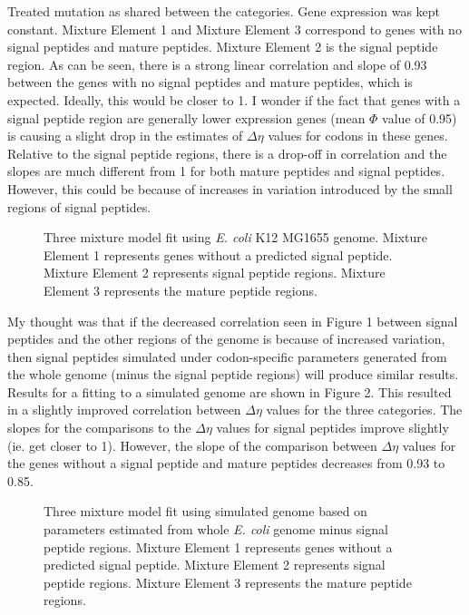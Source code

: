 \documentclass[11pt]{labbook}
\begin{document}
Treated mutation as shared between the categories. Gene expression was kept constant. Mixture Element 1 and Mixture Element 3 correspond to genes with no signal peptides and mature peptides. Mixture Element 2 is the signal peptide region. As can be seen, there is a strong linear correlation and slope of 0.93 between the genes with no signal peptides and mature peptides, which is expected. Ideally, this would be closer to 1. I wonder if the fact that genes with a signal peptide region are generally lower expression genes (mean $\Phi$ value of 0.95) is causing a slight drop in the estimates of $\Delta\eta$ values for codons in these genes. Relative to the signal peptide regions, there is a drop-off in correlation and the slopes are much different from 1 for both mature peptides and signal peptides. However, this could be because of increases in variation introduced by the small regions of signal peptides.
\begin{figure}
\caption{Three mixture model fit using \textit{E. coli} K12 MG1655 genome. Mixture Element 1 represents genes without a predicted signal peptide. Mixture Element 2 represents signal peptide regions. Mixture Element 3 represents the mature peptide regions.}
\end{figure}
My thought was that if the decreased correlation seen in Figure 1 between signal peptides and the other regions of the genome is because of increased variation, then signal peptides simulated under codon-specific parameters generated from the whole genome (minus the signal peptide regions) will produce similar results. Results for a fitting to a simulated genome are shown in Figure 2. This resulted in a slightly improved correlation between $\Delta\eta$ values for the three categories. The slopes for the comparisons to the $\Delta\eta$ values for signal peptides improve slightly (ie. get closer to 1). However, the slope of the comparison between $\Delta\eta$ values for the genes without a signal peptide and mature peptides decreases from 0.93 to 0.85.

\begin{figure}
\caption{Three mixture model fit using simulated genome based on parameters estimated from whole \textit{E. coli} genome minus signal peptide regions. Mixture Element 1 represents genes without a predicted signal peptide. Mixture Element 2 represents signal peptide regions. Mixture Element 3 represents the mature peptide regions.}
\end{figure}
\newpage
\end{document}
